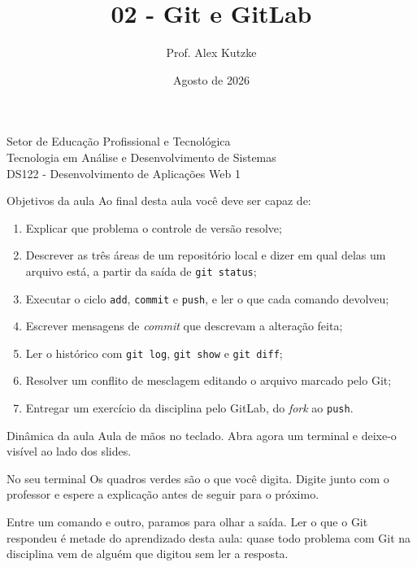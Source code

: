 \documentclass{beamer}
\title{02 - Git e GitLab}
\author{Prof. Alex Kutzke}
\date{Agosto de 2026}
\begin{document}
\begin{frame}
  \begin{center}
    \large{Setor de Educação Profissional e Tecnológica}\\
    Tecnologia em Análise e Desenvolvimento de Sistemas\\
    \vspace{1cm}
    \small{DS122 - Desenvolvimento de Aplicações Web 1}
  \end{center}
  \titlepage
\end{frame}

\begin{frame}{Objetivos da aula}
  Ao final desta aula você deve ser capaz de:
  \begin{enumerate}
    \item Explicar que problema o controle de versão resolve;
    \item Descrever as três áreas de um repositório local e dizer em qual delas
          um arquivo está, a partir da saída de \texttt{git status};
    \item Executar o ciclo \texttt{add}, \texttt{commit} e \texttt{push}, e ler
          o que cada comando devolveu;
    \item Escrever mensagens de \textit{commit} que descrevam a alteração feita;
    \item Ler o histórico com \texttt{git log}, \texttt{git show} e
          \texttt{git diff};
    \item Resolver um conflito de mesclagem editando o arquivo marcado pelo Git;
    \item Entregar um exercício da disciplina pelo GitLab, do \textit{fork} ao
          \texttt{push}.
  \end{enumerate}
\end{frame}

\begin{frame}{Dinâmica da aula}
  Aula de mãos no teclado. Abra agora um terminal e deixe-o visível ao lado dos
  slides.

  \vspace{0.4cm}
  \begin{exampleblock}{No seu terminal}
    Os quadros verdes são o que você digita. Digite junto com o professor e
    espere a explicação antes de seguir para o próximo.
  \end{exampleblock}

  \vspace{0.4cm}
  Entre um comando e outro, paramos para olhar a saída. Ler o que o Git
  respondeu é metade do aprendizado desta aula: quase todo problema com Git na
  disciplina vem de alguém que digitou sem ler a resposta.
\end{frame}
\end{document}
